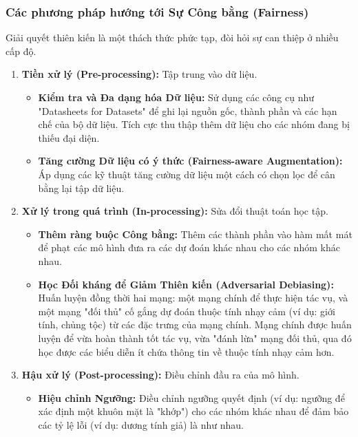 \subsubsection{Các phương pháp hướng tới Sự Công bằng (Fairness)}
\label{subsubsec:mitigating_bias}
Giải quyết thiên kiến là một thách thức phức tạp, đòi hỏi sự can thiệp ở nhiều cấp độ.
\begin{enumerate}
    \item \textbf{Tiền xử lý (Pre-processing):} Tập trung vào dữ liệu.
        \begin{itemize}
            \item \textbf{Kiểm tra và Đa dạng hóa Dữ liệu:} Sử dụng các công cụ như "Datasheets for Datasets" \cite{Gebru2021} để ghi lại nguồn gốc, thành phần và các hạn chế của bộ dữ liệu. Tích cực thu thập thêm dữ liệu cho các nhóm đang bị thiếu đại diện.
            \item \textbf{Tăng cường Dữ liệu có ý thức (Fairness-aware Augmentation):} Áp dụng các kỹ thuật tăng cường dữ liệu một cách có chọn lọc để cân bằng lại tập dữ liệu.
        \end{itemize}
    \item \textbf{Xử lý trong quá trình (In-processing):} Sửa đổi thuật toán học tập.
        \begin{itemize}
            \item \textbf{Thêm ràng buộc Công bằng:} Thêm các thành phần vào hàm mất mát để phạt các mô hình đưa ra các dự đoán khác nhau cho các nhóm khác nhau.
            \item \textbf{Học Đối kháng để Giảm Thiên kiến (Adversarial Debiasing):} Huấn luyện đồng thời hai mạng: một mạng chính để thực hiện tác vụ, và một mạng "đối thủ" cố gắng dự đoán thuộc tính nhạy cảm (ví dụ: giới tính, chủng tộc) từ các đặc trưng của mạng chính. Mạng chính được huấn luyện để vừa hoàn thành tốt tác vụ, vừa "đánh lừa" mạng đối thủ, qua đó học được các biểu diễn ít chứa thông tin về thuộc tính nhạy cảm hơn.
        \end{itemize}
    \item \textbf{Hậu xử lý (Post-processing):} Điều chỉnh đầu ra của mô hình.
        \begin{itemize}
            \item \textbf{Hiệu chỉnh Ngưỡng:} Điều chỉnh ngưỡng quyết định (ví dụ: ngưỡng để xác định một khuôn mặt là "khớp") cho các nhóm khác nhau để đảm bảo các tỷ lệ lỗi (ví dụ: dương tính giả) là như nhau.
        \end{itemize}
\end{enumerate}

